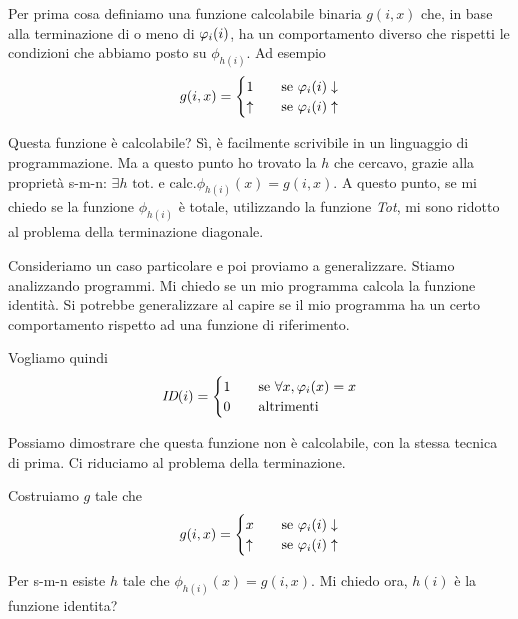 Per prima cosa definiamo una funzione calcolabile binaria $g(i,x)$ che, in base alla terminazione di
o meno di $\varphi_{i}(i)$, ha un comportamento diverso che rispetti le condizioni che abbiamo posto su
$\phi_{h(i)}$. Ad esempio
\begin{equation*}
    g(i,x) =
    \begin{cases}
        1 \quad &\text{se $\varphi_{i}(i)\downarrow$} \\
        \uparrow \quad &\text{se $\varphi_{i}(i)\uparrow$} \\
    \end{cases}
\end{equation*}

Questa funzione è calcolabile? Sì, è facilmente scrivibile in un linguaggio di programmazione. Ma a
questo punto ho trovato la $h$ che cercavo, grazie alla proprietà s-m-n: $\exists h \text{ tot. e
calc.} \phi_{h(i)}(x) = g(i,x)$. A questo punto, se mi chiedo se la funzione $\phi_{h(i)}$ è totale,
utilizzando la funzione \textit{Tot}, mi sono ridotto al problema della terminazione diagonale.

Consideriamo un caso particolare e poi proviamo a generalizzare. Stiamo analizzando programmi. Mi
chiedo se un mio programma calcola la funzione identità. Si potrebbe generalizzare al capire se il
mio programma ha un certo comportamento rispetto ad una funzione di riferimento.

Vogliamo quindi
\begin{equation*}
    \textit{ID}(i) =
    \begin{cases}
        1 \quad &\text{se $\forall x, \varphi_{i}(x) = x$} \\
        0 \quad &\text{altrimenti}
    \end{cases}
\end{equation*}

Possiamo dimostrare che questa funzione non è calcolabile, con la stessa tecnica di prima. Ci
riduciamo al problema della terminazione.

Costruiamo $g$ tale che
\begin{equation*}
    g(i,x) =
    \begin{cases}
        x \quad & \text{se $\varphi_{i}(i) \downarrow$} \\
        \uparrow \quad & \text{se $\varphi_{i}(i) \uparrow$}
    \end{cases}
\end{equation*}

Per s-m-n esiste $h$ tale che $\phi_{h(i)}(x) = g(i,x)$. Mi chiedo ora, $h(i)$ è la funzione
identita?

